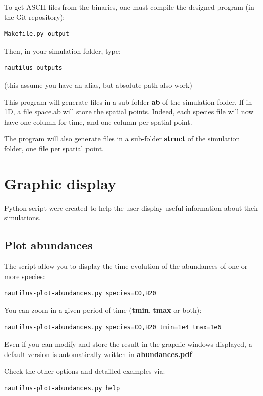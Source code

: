 \documentclass[english,a4paper,twoside]{article}
\begin{document}
To get ASCII files from the binaries, one must compile the designed program (in the Git repository):
\begin{verbatim}
Makefile.py output
\end{verbatim}

Then, in your simulation folder, type:
\begin{verbatim}
nautilus_outputs
\end{verbatim}
(this assume you have an alias, but absolute path also work)

This program will generate  files in a sub-folder \textbf{ab} of the simulation folder. If in 1D, a file space.ab will store the spatial points. Indeed, each species file will now have one column for time, and one column per spatial point.

The program will also generate  files in a sub-folder \textbf{struct} of the simulation folder, one file per spatial point. 

\section{Graphic display}\label{sec:graphic-display}
Python script were created to help the user display useful information about their simulations. 

\subsection{Plot abundances}
The script  allow you to display the time evolution of the abundances of one or more species:
\begin{verbatim}
nautilus-plot-abundances.py species=CO,H20
\end{verbatim}

You can zoom in a given period of time (\textbf{tmin}, \textbf{tmax} or both):
\begin{verbatim}
nautilus-plot-abundances.py species=CO,H20 tmin=1e4 tmax=1e6
\end{verbatim}

Even if you can modify and store the result in the graphic windows displayed, a default version is automatically written in \textbf{abundances.pdf} 

Check the other options and detailled examples via:
\begin{verbatim}
nautilus-plot-abundances.py help
\end{verbatim}
\end{document}
